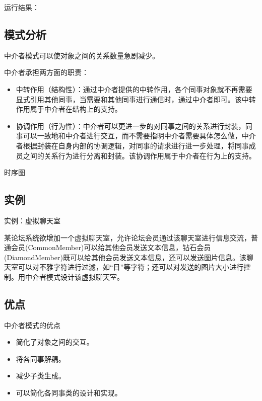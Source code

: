 \documentclass[letterpaper,10pt,english]{sphinxmanual}
\begin{document}
\sphinxAtStartPar
运行结果：

\noindent{}


\subsection{模式分析}
\label{\detokenize{behavioral_patterns/mediator:id8}}
\sphinxAtStartPar
中介者模式可以使对象之间的关系数量急剧减少。

\sphinxAtStartPar
中介者承担两方面的职责：
\begin{itemize}
\item {} 
\sphinxAtStartPar
中转作用（结构性）：通过中介者提供的中转作用，各个同事对象就不再需要显式引用其他同事，当需要和其他同事进行通信时，通过中介者即可。该中转作用属于中介者在结构上的支持。

\item {} 
\sphinxAtStartPar
协调作用（行为性）：中介者可以更进一步的对同事之间的关系进行封装，同事可以一致地和中介者进行交互，而不需要指明中介者需要具体怎么做，中介者根据封装在自身内部的协调逻辑，对同事的请求进行进一步处理，将同事成员之间的关系行为进行分离和封装。该协调作用属于中介者在行为上的支持。

\end{itemize}

\noindent{}

\sphinxAtStartPar
时序图

\noindent{}


\subsection{实例}
\label{\detokenize{behavioral_patterns/mediator:id9}}
\sphinxAtStartPar
实例：虚拟聊天室

\sphinxAtStartPar
某论坛系统欲增加一个虚拟聊天室，允许论坛会员通过该聊天室进行信息交流，普通会员(CommonMember)可以给其他会员发送文本信息，钻石会员(DiamondMember)既可以给其他会员发送文本信息，还可以发送图片信息。该聊天室可以对不雅字符进行过滤，如“日”等字符；还可以对发送的图片大小进行控制。用中介者模式设计该虚拟聊天室。


\subsection{优点}
\label{\detokenize{behavioral_patterns/mediator:id10}}
\sphinxAtStartPar
中介者模式的优点
\begin{itemize}
\item {} 
\sphinxAtStartPar
简化了对象之间的交互。

\item {} 
\sphinxAtStartPar
将各同事解耦。

\item {} 
\sphinxAtStartPar
减少子类生成。

\item {} 
\sphinxAtStartPar
可以简化各同事类的设计和实现。

\end{itemize}
\end{document}
